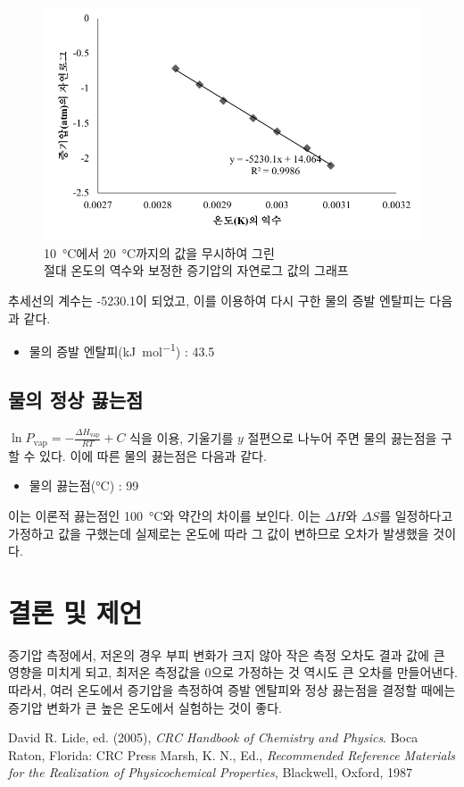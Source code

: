 \documentclass{GSHS-chemexp}
\begin{document}
	\begin{figure}[H]
		\centering
		\includegraphics[scale=1]{Book3_3.pdf}
		\caption{\SI{10}{\degreeCelsius}에서 \SI{20}{\degreeCelsius}까지의 값을 무시하여 그린\\절대 온도의 역수와 보정한 증기압의 자연로그 값의 그래프}
		\label{exp_graph_3}
	\end{figure}
	
	추세선의 계수는 -5230.1이 되었고, 이를 이용하여 다시 구한 물의 증발 엔탈피는 다음과 같다.
	\begin{itemize}
		\item 물의 증발 엔탈피(\si{\kilo\joule\per\mole}) : 43.5
	\end{itemize}
	
	\subsection{물의 정상 끓는점}
	$\ln P_{\mathrm{vap}} = -\frac{\Delta H_{\mathrm{vap}}}{RT} + C$ 식을 이용, 기울기를 $y$ 절편으로 나누어 주면 물의 끓는점을 구할 수 있다. 이에 따른 물의 끓는점은 다음과 같다.
	\begin{itemize}
		\item 물의 끓는점(\si{\degreeCelsius}) : 99
	\end{itemize}
	이는 이론적 끓는점인 \SI{100}{\degreeCelsius}와 약간의 차이를 보인다. 이는 $\Delta H$와 $\Delta S$를 일정하다고 가정하고 값을 구했는데 실제로는 온도에 따라 그 값이 변하므로 오차가 발생했을 것이다.
	
	\section{결론 및 제언}
	증기압 측정에서, 저온의 경우 부피 변화가 크지 않아 작은 측정 오차도 결과 값에 큰 영향을 미치게 되고, 최저온 측정값을 0으로 가정하는 것 역시도 큰 오차를 만들어낸다. 따라서, 여러 온도에서 증기압을 측정하여 증발 엔탈피와 정상 끓는점을 결정할 때에는 증기압 변화가 큰 높은 온도에서 실험하는 것이 좋다.
	
	
	\begin{thebibliography}{00}
		 David R. Lide, ed. (2005), \textit{CRC Handbook of Chemistry and Physics}. Boca Raton, Florida: CRC Press
		 Marsh, K. N., Ed., \textit{Recommended Reference Materials for the Realization of Physicochemical Properties}, Blackwell, Oxford, 1987 %
	\end{thebibliography}
			
\end{document}
